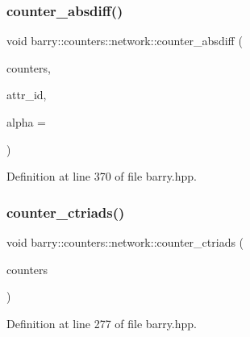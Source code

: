 \subsubsection{\texorpdfstring{counter\+\_\+absdiff()}{counter\_absdiff()}}
{\footnotesize\ttfamily void barry\+::counters\+::network\+::counter\+\_\+absdiff (\begin{DoxyParamCaption}\item[{\hyperlink{namespacebarry_1_1counters_1_1network_a3b3c590303d47840d1967372ae495d95}{Net\+Counter\+Vector} $\ast$}]{counters,  }\item[{\hyperlink{namespacebarry_a11dfc53ddb4672278319aa04f1e09a6c}{uint}}]{attr\+\_\+id,  }\item[{double}]{alpha = {} }\end{DoxyParamCaption})\hspace{0.3cm}{\ttfamily [inline]}}



Definition at line 370 of file barry.\+hpp.

\mbox{\label{namespacebarry_1_1counters_1_1network_a5262c1e8a14c9956041adead348a4890}} 
\subsubsection{\texorpdfstring{counter\+\_\+ctriads()}{counter\_ctriads()}}
{\footnotesize\ttfamily void barry\+::counters\+::network\+::counter\+\_\+ctriads (\begin{DoxyParamCaption}\item[{\hyperlink{namespacebarry_1_1counters_1_1network_a3b3c590303d47840d1967372ae495d95}{Net\+Counter\+Vector} $\ast$}]{counters }\end{DoxyParamCaption})\hspace{0.3cm}{\ttfamily [inline]}}



Definition at line 277 of file barry.\+hpp.

\mbox{\label{namespacebarry_1_1counters_1_1network_a313ba439c81c589759cbbc613d12e80b}} 
